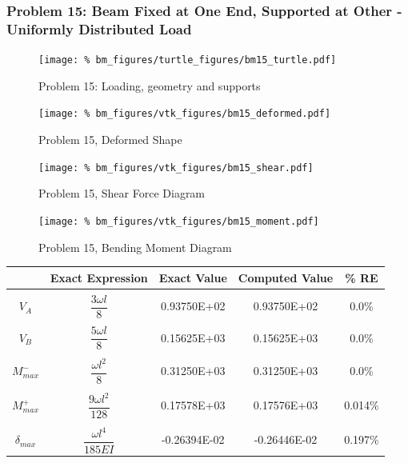 \subsubsection{Problem 15: Beam Fixed at One End, Supported at Other - Uniformly Distributed Load}
\begin{figure}[h]
    \texttt{[image: \%
                            bm\_figures/turtle\_figures/bm15\_turtle.pdf]}
    \centering
    \caption{Problem 15: Loading, geometry and supports}
    \label{fig:bm15_turtle}
\end{figure}


\begin{figure}[!htb]
    \texttt{[image: \%
                     bm\_figures/vtk\_figures/bm15\_deformed.pdf]}
    \centering
    \caption{Problem 15, Deformed Shape}
    \label{fig:bm15_deformed}
\end{figure}
\begin{figure}[!htb]
    \texttt{[image: \%
                     bm\_figures/vtk\_figures/bm15\_shear.pdf]}
    \centering
    \caption{Problem 15, Shear Force Diagram}
    \label{fig:bm15_shear}
\end{figure}
\begin{figure}[!htb]
    \texttt{[image: \%
                     bm\_figures/vtk\_figures/bm15\_moment.pdf]}
    \centering
    \caption{Problem 15, Bending Moment Diagram}
    \label{fig:bm15_moment}
\end{figure}
\begin{table}[h!]
\centering
\begin{tabular}{ c| c c c c }
    & Exact Expression & Exact Value & Computed Value & \% RE \\ \hline \\
    $V_A$  & $\dfrac{3\omega l}{8}$ & 0.93750E+02 & 0.93750E+02 & 0.0\% \\ \\
    $V_B$  & $\dfrac{5\omega l}{8}$ & 0.15625E+03 & 0.15625E+03 & 0.0\% \\ \\
    $M_{max}^-$ & $\dfrac{\omega l^2}{8}$ & 0.31250E+03 & 0.31250E+03 & 0.0\% \\ \\
    $M_{max}^+$ & $\dfrac{9\omega l^2}{128}$ & 0.17578E+03 & 0.17576E+03 & 0.014\% \\ \\
    $\delta_{max}$ & $\dfrac{\omega l^4}{185EI}$ & -0.26394E-02 & -0.26446E-02 & 0.197\% \\
\end{tabular}
\end{table}

